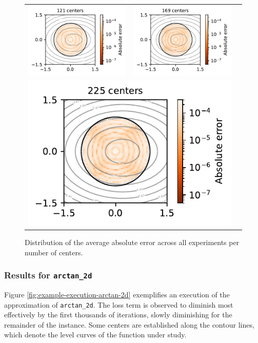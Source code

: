 \documentclass[12pt]{report} %
\begin{document}
\begin{figure}
\begin{tabular}{ccl}
    \multicolumn{1}{r}{\includegraphics[width=.4\textwidth, clip=true,trim={0 0 2.1cm 0}]{imagenes/experiments/2d/statistical_2d_full_scheduler_interpolation/runge_2d/runge_2d_121.pdf}} & \includegraphics[width=.4\textwidth, clip=true,trim={0 0 2.1cm 0}]{imagenes/experiments/2d/statistical_2d_full_scheduler_interpolation/runge_2d/runge_2d_169.pdf} & \\
    \multicolumn{2}{l}{\includegraphics[width=.4\textwidth, clip=true,trim={0 0 2.1cm 0}]{imagenes/experiments/2d/statistical_2d_full_scheduler_interpolation/runge_2d/runge_2d_225.pdf}} &
  \end{tabular}
  \caption{Distribution of the average absolute error across all experiments per number of centers.}
  \label{fig:runge-2d-results-errors-avg}
\end{figure}

\clearpage
\subsubsection*{Results for \texttt{arctan\_2d}}

Figure \ref{fig:example-execution-arctan-2d} exemplifies an execution of the approximation of \texttt{arctan\_2d}. The loss term is observed to diminish most effectively by the first thousands of iterations, slowly diminishing for the remainder of the instance. Some centers are established along the contour lines, which denote the level curves of the function under study.
\end{document}
